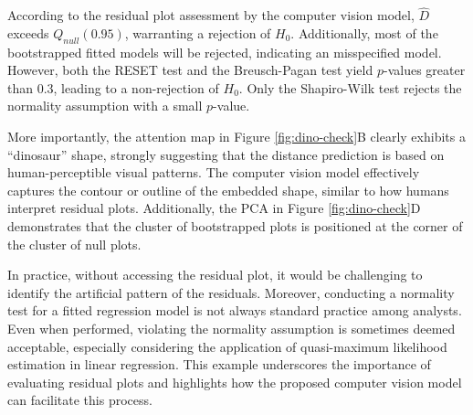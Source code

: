 \documentclass[]{interact}
\theoremstyle{plain}%
\theoremstyle{definition}
\theoremstyle{remark}
\begin{document}
According to the residual plot assessment by the computer vision model,
\(\hat{D}\) exceeds \(Q_{null}(0.95)\), warranting a rejection of
\(H_0\). Additionally, most of the bootstrapped fitted models will be
rejected, indicating an misspecified model. However, both the RESET test
and the Breusch-Pagan test yield \(p\)-values greater than 0.3, leading
to a non-rejection of \(H_0\). Only the Shapiro-Wilk test rejects the
normality assumption with a small \(p\)-value.

More importantly, the attention map in Figure \ref{fig:dino-check}B
clearly exhibits a ``dinosaur'' shape, strongly suggesting that the
distance prediction is based on human-perceptible visual patterns. The
computer vision model effectively captures the contour or outline of the
embedded shape, similar to how humans interpret residual plots.
Additionally, the PCA in Figure \ref{fig:dino-check}D demonstrates that
the cluster of bootstrapped plots is positioned at the corner of the
cluster of null plots.

In practice, without accessing the residual plot, it would be
challenging to identify the artificial pattern of the residuals.
Moreover, conducting a normality test for a fitted regression model is
not always standard practice among analysts. Even when performed,
violating the normality assumption is sometimes deemed acceptable,
especially considering the application of quasi-maximum likelihood
estimation in linear regression. This example underscores the importance
of evaluating residual plots and highlights how the proposed computer
vision model can facilitate this process.
\end{document}
